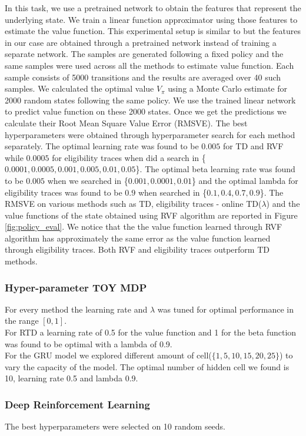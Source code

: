 In this task, we use a pretrained network to obtain the features that represent the underlying state. We train a linear function approximator using those features to estimate the value function. This experimental setup is similar to \cite{chung2018two} but the features in our case are obtained through a pretrained network instead of training a separate network. The samples are generated following a fixed policy and the same samples were used across all the methods to estimate value function. Each sample consists of 5000 transitions and the results are averaged over 40 such samples. We calculated the optimal value $V_\pi$ using a Monte Carlo estimate for 2000 random states following the same policy. We use the trained linear network to predict value function on these 2000 states. Once we get the predictions we calculate their Root Mean Square Value Error (RMSVE). The best hyperparameters were obtained through hyperparameter search for each method separately. The optimal learning rate was found to be $0.005$ for TD and RVF while $0.0005$ for eligibility traces when did a search in \{$0.0001, 0.0005, 0.001, 0.005, 0.01, 0.05$\}. The optimal beta learning rate was found to be $0.005$ when we searched in \{$0.001, 0.0001, 0.01$\} and the optimal lambda for eligibility traces was found to be $0.9$ when searched in \{$0.1, 0.4, 0.7, 0.9$\}. The RMSVE on various methods such as TD, eligibility traces - online TD($\lambda$) and the value functions of the state obtained using RVF algorithm are reported in Figure \ref{fig:policy_eval}. We notice that the the value function learned through RVF algorithm has approximately the same error as the value function learned through eligibility traces. Both RVF and eligibility traces outperform TD methods.
\subsubsection{Hyper-parameter TOY MDP}
\label{hyper_toy}
For every method the learning rate and $\lambda$ was tuned for optimal performance in the range $[0,1]$.\\
For RTD a learning rate of 0.5 for the value function and 1 for the beta function was found to be optimal with a lambda of 0.9.\\
For the GRU model we explored different amount of cell($\{1,5,10,15,20,25\}$) to vary the capacity of the model. The optimal number of hidden cell we found is 10, learning rate 0.5 and lambda 0.9. 
\subsubsection{Deep Reinforcement Learning}
\label{deep_RL_appendix}
The best hyperparameters were selected on 10 random seeds. 
